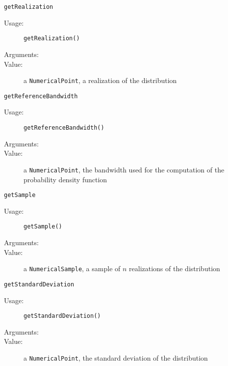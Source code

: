 \begin{description}
\begin{description}
  \item \texttt{getRealization}
    \begin{description}
    \item[Usage:]  \texttt{getRealization()}
    \item[Arguments:]  \strut
    \item[Value:] a \texttt{NumericalPoint}, a realization of the distribution
    \end{description}

  \item \texttt{getReferenceBandwidth}
    \begin{description}
    \item[Usage:]  \texttt{getReferenceBandwidth()}
    \item[Arguments:]  \strut
    \item[Value:] a \texttt{NumericalPoint}, the bandwidth used for the computation of the probability density function
    \end{description}

  \item \texttt{getSample}
    \begin{description}
    \item[Usage:]  \texttt{getSample()}
    \item[Arguments:]  \strut
    \item[Value:] a \texttt{NumericalSample}, a sample of $n$ realizations of the distribution
    \end{description}

  \item \texttt{getStandardDeviation}
    \begin{description}
    \item[Usage:]  \texttt{getStandardDeviation()}
    \item[Arguments:]  \strut
    \item[Value:] a \texttt{NumericalPoint}, the standard deviation of the distribution
    \end{description}


\end{description}
\end{description}
